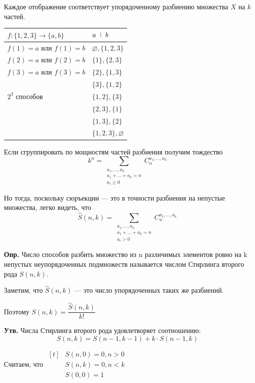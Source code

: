 \documentclass[10pt, a4paper]{article}
\begin{document}
\vspace{0.4cm}
\noindent
Каждое отображение соответствует упорядоченному разбиению множества $X$ на $k$ частей.

\nopagebreak
\begin{center}
\renewcommand{\arraystretch}{1.2}
\begin{tabular}{l|l}
$f \colon \{1, 2, 3\} \to \{a, b\}$ & $a \ \ \vline \ \ b$ \\
\hline
$f(1) = a$ или $f(1) = b$ & $\varnothing, \{1, 2, 3\}$ \\
$f(2) = a$ или $f(2) = b$ & $\{1\}, \{2, 3\}$ \\
$f(3) = a$ или $f(3) = b$ & $\{2\}, \{1, 3\}$ \\
& $\{3\}, \{1, 2\}$ \\
\hfill $2^3 \text{ способов}$ & $\{1, 2\}, \{3\}$ \\
& $\{2, 3\}, \{1\}$ \\
& $\{1, 3\}, \{2\}$ \\
& $\{1, 2, 3\}, \varnothing$ \\
\end{tabular}
\end{center}

\noindent Если сгруппировать по мощностям частей разбиения получим тождество
\[ k^n = \sum_{\substack{a_1, \dots, a_k \\ a_1 + \dots + a_k = n \\ a_i \ge 0}} C_n^{a_1, \dots, a_k} \]

\noindent Но тогда, поскольку сюръекции --- это в точности разбиения на непустые множества, легко видеть, что
\[ \hat{S}(n, k) = \sum_{\substack{a_1, \dots, a_k \\ a_1 + \dots + a_k = n \\ a_i > 0}} C_n^{a_1, \dots, a_k} \]

\noindent \textbf{Опр.} Число способов разбить множество из n различимых элементов ровно на k непустых неупорядоченных подмножеств называется числом Стирлинга второго рода $S(n,k)$.

\noindent Заметим, что $\hat{S}(n,k)$ --- это число упорядоченных таких же разбиений.

\nopagebreak
\noindent
Поэтому $S(n,k) = \dfrac{\hat{S}(n,k)}{k!}$

\medskip
\noindent
\textbf{Утв.} Числа Стирлинга второго рода удовлетворяет соотношению:
\[ S(n,k) = S(n-1, k-1) + k \cdot S(n-1, k) \]

\noindent
Считаем, что 
$\begin{aligned}[t]
&S(n,0) = 0, n > 0 \\
&S(n,k) = 0, n < k \\
&S(0,0) = 1
\end{aligned}$
\end{document}
